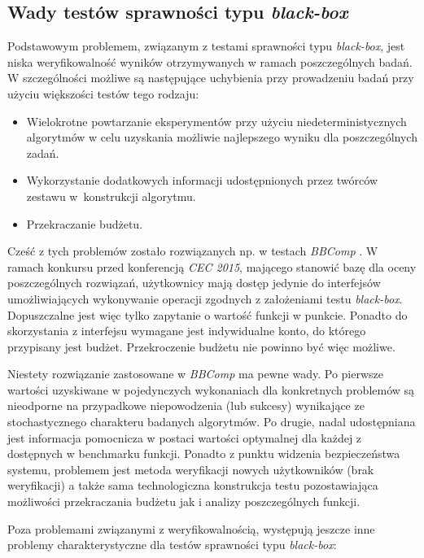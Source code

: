 \documentclass[12pt,a4paper]{report}
\begin{document}
{{{{{{\subsection{Wady testów sprawności typu \emph{black-box}}          
\label{WadyBB}
\par{
Podstawowym problemem, związanym z testami sprawności typu \emph{black-box}, jest niska weryfikowalność wyników otrzymywanych w ramach poszczególnych badań. W szczególności możliwe są następujące uchybienia przy prowadzeniu badań przy użyciu większości testów tego rodzaju:
\begin{itemize}
\item Wielokrotne powtarzanie eksperymentów przy użyciu niedeterministycznych algorytmów w celu uzyskania możliwie najlepszego wyniku dla poszczególnych zadań.
\item Wykorzystanie dodatkowych informacji udostępnionych przez twórców zestawu w~konstrukcji algorytmu.
\item Przekraczanie budżetu.
\end{itemize}
Cześć z tych problemów zostało rozwiązanych np. w testach \emph{BBComp} \cite{BBComp}. W ramach konkursu przed konferencją \emph{CEC 2015}, mającego stanowić bazę dla oceny poszczególnych rozwiązań, użytkownicy mają dostęp jedynie do interfejsów umożliwiających wykonywanie operacji zgodnych z założeniami testu \emph{black-box}. Dopuszczalne jest więc tylko zapytanie o wartość funkcji w punkcie. Ponadto do skorzystania z interfejsu wymagane jest indywidualne konto, do którego przypisany jest budżet. Przekroczenie budżetu nie powinno być więc możliwe.
}
\par{
Niestety rozwiązanie zastosowane w \emph{BBComp} ma pewne wady. Po pierwsze wartości uzyskiwane w pojedynczych wykonaniach dla konkretnych problemów są nieodporne na przypadkowe niepowodzenia (lub sukcesy) wynikające ze stochastycznego charakteru badanych algorytmów.
Po drugie, nadal udostępniana jest informacja pomocnicza w postaci wartości optymalnej dla każdej z dostępnych w benchmarku funkcji. Ponadto z punktu widzenia bezpieczeństwa systemu, problemem jest metoda weryfikacji nowych użytkowników (brak weryfikacji) a także sama technologiczna konstrukcja testu pozostawiająca możliwości przekraczania budżetu jak i analizy poszczególnych funkcji.
}
\par{
Poza problemami związanymi z weryfikowalnością, występują jeszcze inne problemy charakterystyczne dla testów sprawności typu \emph{black-box}:
\begin{description}

\end{description}}}}}}}}
\end{document}
